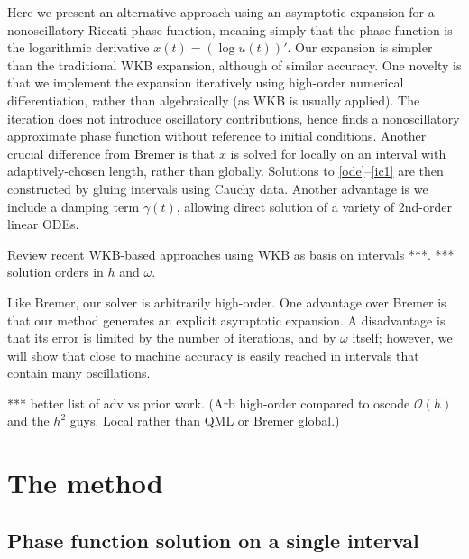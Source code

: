 \documentclass[10pt]{article}
\newcommand{\bigO}{{\mathcal O}}
\newcommand{\om}{\omega}
\begin{document}
Here we present an alternative approach using
an asymptotic expansion for a nonoscillatory
Riccati phase function, meaning simply that the
phase function is the logarithmic derivative $x(t) = (\log u(t))'$.
Our expansion is simpler than the traditional WKB expansion,
although of similar accuracy.
One novelty is that we
implement the expansion iteratively
using high-order numerical differentiation, rather
than algebraically (as WKB is usually applied).
The iteration does not introduce oscillatory contributions,
hence finds a nonoscillatory approximate phase function without
reference to initial conditions.
Another crucial difference from Bremer is that $x$ is solved for
locally on an interval with adaptively-chosen length, rather than
globally.
Solutions to \eqref{ode}--\eqref{ic1} are then constructed by
gluing intervals using Cauchy data.
Another advantage is we include a damping term $\gamma(t)$,
allowing direct
solution of a variety of 2nd-order linear ODEs.

Review recent WKB-based approaches using WKB as basis on intervals ***.
*** solution orders in $h$ and $\om$.

Like Bremer, our solver is arbitrarily high-order.
One advantage over Bremer is that our method generates an explicit asymptotic
expansion. A disadvantage is that its error is limited by the number
of iterations, and by $\omega$ itself; however,
we will show that close to machine accuracy is easily reached in
intervals that contain many oscillations.

*** better list of adv vs prior work.
(Arb high-order compared to oscode $\bigO(h)$ and the $h^2$ guys.
Local rather than QML or Bremer global.)



\section{The method}

\subsection{Phase function solution on a single interval}
\end{document}
